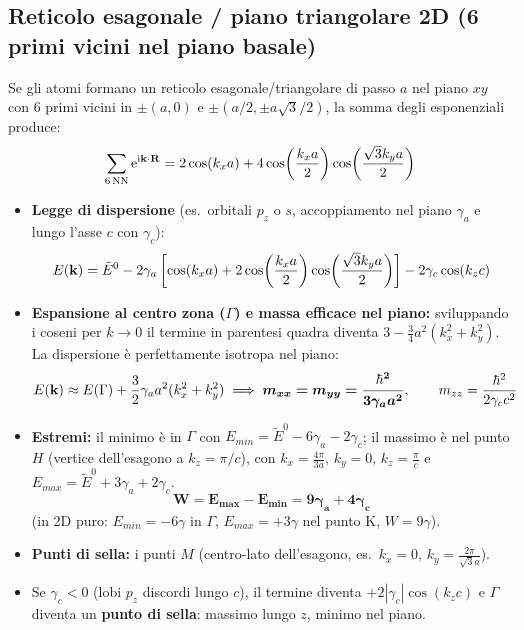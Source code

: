 \subsection{Reticolo esagonale / piano triangolare 2D (6 primi vicini nel piano basale)}
Se gli atomi formano un reticolo esagonale/triangolare di passo $a$ nel piano $xy$ con 6 primi vicini in $\pm(a,0)$ e $\pm(a/2,\pm a\sqrt3/2)$, la somma degli esponenziali produce:
\[ \sum_{6\,\text{NN}} \mathrm{e}^{\mathrm{i}\mathbf{k}\cdot\mathbf{R}} = 2\cos(k_xa) + 4\cos\!\left(\frac{k_xa}{2}\right)\cos\!\left(\frac{\sqrt3 k_ya}{2}\right) \]
\begin{itemize}
    \setlength{\itemsep}{1pt}
    \item \textbf{Legge di dispersione} (es.\ orbitali $p_z$ o $s$, accoppiamento nel piano $\gamma_a$ e lungo l'asse $c$ con $\gamma_c$):
    \[ E(\mathbf{k}) = \tilde E^0 - 2\gamma_a\left[\cos(k_xa) + 2\cos\!\left(\frac{k_xa}{2}\right)\cos\!\left(\frac{\sqrt3 k_ya}{2}\right)\right] - 2\gamma_c\cos(k_zc) \]
    \item \textbf{Espansione al centro zona ($\Gamma$) e massa efficace nel piano:} sviluppando i coseni per $k\to0$ il termine in parentesi quadra diventa $3-\frac34 a^2(k_x^2+k_y^2)$. La dispersione è perfettamente isotropa nel piano:
    \[ E(\mathbf{k}) \approx E(\Gamma) + \frac{3}{2}\gamma_a a^2(k_x^2+k_y^2)
       \implies \bm{m_{xx}=m_{yy}=\frac{\hbar^2}{3\gamma_a a^2}}, \qquad m_{zz}=\frac{\hbar^2}{2\gamma_c c^2} \]
    \item \textbf{Estremi:} il minimo è in $\Gamma$ con $E_{min}=\tilde E^0-6\gamma_a-2\gamma_c$; il massimo è nel punto $H$ (vertice dell'esagono a $k_z=\pi/c$), con $k_x = \frac{4\pi}{3a},\,k_y=0,\,k_z=\frac{\pi}{c}$ e $E_{max}=\tilde E^0+3\gamma_a+2\gamma_c$.
    \[ \bm{W = E_{max}-E_{min} = 9\gamma_a + 4\gamma_c} \]
    (in 2D puro: $E_{min}=-6\gamma$ in $\Gamma$, $E_{max}=+3\gamma$ nel punto K, $W=9\gamma$).
    \item \textbf{Punti di sella:} i punti $M$ (centro-lato dell'esagono, es.\ $k_x=0,\,k_y=\frac{2\pi}{\sqrt3 a}$).
    \item Se $\gamma_c<0$ (lobi $p_z$ discordi lungo $c$), il termine diventa $+2|\gamma_c|\cos(k_zc)$ e $\Gamma$ diventa un \textbf{punto di sella}: massimo lungo $z$, minimo nel piano.
\end{itemize}

